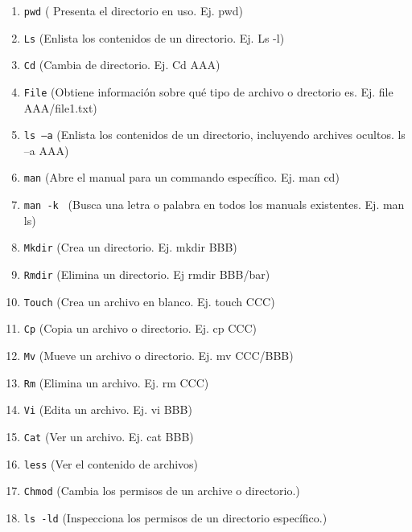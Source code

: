\documentclass[12pt]{article}
\begin{document}
\begin{enumerate}
\item {\tt pwd} ( Presenta el directorio en uso. Ej. pwd) 
\item {\tt Ls} (Enlista los contenidos de un directorio. Ej. Ls -l)
\item {\tt Cd} (Cambia de directorio. Ej. Cd AAA)
\item {\tt File} (Obtiene información sobre qué tipo de archivo o drectorio es. Ej. file AAA/file1.txt) 
\item {\tt ls –a} (Enlista los contenidos de un directorio, incluyendo archives ocultos. ls –a AAA)
\item {\tt man} (Abre el manual para un commando específico. Ej.  man cd) 
\item {\tt man -k } (Busca una letra o palabra en todos los manuals existentes. Ej. man ls)
\item {\tt Mkdir} (Crea un directorio. Ej. mkdir BBB)
\item {\tt Rmdir} (Elimina un directorio. Ej rmdir BBB/bar) 
\item {\tt Touch} (Crea un archivo en blanco. Ej. touch CCC)
\item {\tt Cp} (Copia un archivo o directorio. Ej. cp CCC)
\item {\tt Mv} (Mueve un archivo o directorio. Ej. mv CCC/BBB) 
\item {\tt Rm} (Elimina un archivo. Ej. rm CCC)
\item {\tt Vi} (Edita un archivo. Ej. vi BBB)
\item {\tt Cat} (Ver un archivo. Ej. cat BBB) 
\item {\tt less} (Ver el contenido de archivos)
\item {\tt Chmod} (Cambia los permisos de un archive o directorio.)
\item {\tt ls -ld} (Inspecciona los permisos de un directorio específico.)
\end{enumerate}
\end{document}
